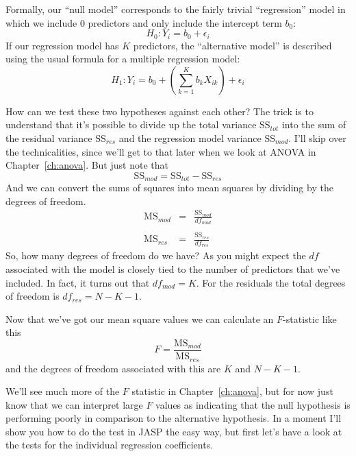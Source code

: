 \vspace{0.5cm}
\begin{mdframed}[style=MyFrame,nobreak=false]
Formally, our ``null model'' corresponds to the fairly trivial ``regression'' model in which we include 0 predictors and only include the intercept term $b_0$:
$$
H_0: Y_i = b_0 + \epsilon_i
$$
If our regression model has $K$ predictors, the ``alternative model'' is described using the usual formula for a multiple regression model:
$$
H_1: Y_i = b_0 + \left( \sum_{k=1}^K b_{k} X_{ik} \right) + \epsilon_i
$$

How can we test these two hypotheses against each other? The trick is to understand that it's possible to divide up the total variance $\mbox{SS}_{tot}$ into the sum of the residual variance $\mbox{SS}_{res}$ and the regression model variance $\mbox{SS}_{mod}$. I'll skip over the technicalities, since we'll get to that later when we look at ANOVA in Chapter~\ref{ch:anova}. But just note that
$$
\mbox{SS}_{mod} = \mbox{SS}_{tot} - \mbox{SS}_{res}
$$
And we can convert the sums of squares into mean squares by dividing by the degrees of freedom. 
$$\begin{array}{rcl}
\mbox{MS}_{mod} &=& \displaystyle\frac{\mbox{SS}_{mod} }{df_{mod}} \\ \\
\mbox{MS}_{res} &=& \displaystyle\frac{\mbox{SS}_{res} }{df_{res}} 
\end{array}
$$ 
So, how many degrees of freedom do we have? As you might expect the $df$ associated with the model is closely tied to the number of predictors that we've included. In fact, it turns out that $df_{mod} = K$. For the residuals the total degrees of freedom is $df_{res} = N -K - 1$. 

Now that we've got our mean square values we can calculate an $F$-statistic like this
$$
F =  \frac{\mbox{MS}_{mod}}{\mbox{MS}_{res}}
$$
and the degrees of freedom associated with this are $K$ and $N-K-1$. 
\end{mdframed}

We'll see much more of the $F$ statistic in Chapter~\ref{ch:anova}, but for now just know that we can interpret large $F$ values as indicating that the null hypothesis is performing poorly in comparison to the alternative hypothesis. In a moment I'll show you how to do the test in JASP the easy way, but first let's have a look at the tests for the individual regression coefficients.



